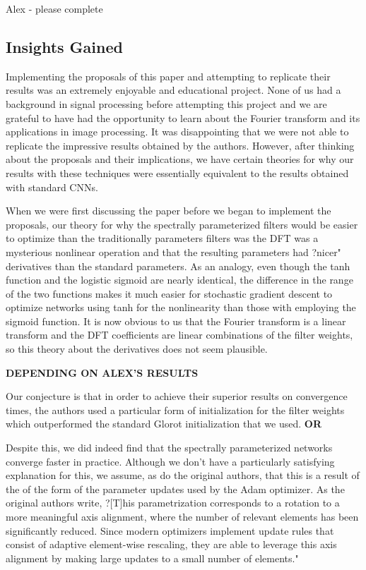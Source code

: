 \documentclass[10pt,journal,compsoc]{IEEEtran}
\begin{document}
Alex - please complete



\subsection{Insights Gained}

Implementing the proposals of this paper and attempting to replicate their results was an extremely enjoyable and educational project. None of us had a background in signal processing before attempting this project and we are grateful to have had the opportunity to learn about the Fourier transform and its applications in image processing. It was disappointing that we were not able to replicate the impressive results obtained by the authors. However, after thinking about the proposals and their implications, we have certain theories for why our results with these techniques were essentially equivalent to the results obtained with standard CNNs. 

When we were first discussing the paper before we began to implement the proposals, our theory for why the spectrally parameterized filters would be easier to optimize than the traditionally parameters filters was the DFT was a mysterious nonlinear operation and that the resulting parameters had ?nicer" derivatives than the standard parameters. As an analogy, even though the tanh function and the logistic sigmoid are nearly identical, the difference in the range of the two functions makes it much easier for stochastic gradient descent to optimize networks using tanh for the nonlinearity than those with employing the sigmoid function. It is now obvious to us that the Fourier transform is a linear transform and the DFT coefficients are linear combinations of the filter weights, so this theory about the derivatives does not seem plausible. 

\textbf{DEPENDING ON ALEX'S RESULTS}

Our conjecture is that in order to achieve their superior results on convergence times, the authors used a particular form of initialization for the filter weights which outperformed the standard Glorot initialization that we used. 
\textbf{OR}

Despite this, we did indeed find that the spectrally parameterized networks converge faster in practice. Although we don't have a particularly satisfying explanation for this, we assume, as do the original authors, that this is a result of the of the form of the parameter updates used by the Adam optimizer. As the original authors write, ?[T]his parametrization corresponds to a rotation to a more meaningful axis alignment, where the number of relevant elements has been significantly reduced. Since modern optimizers implement update rules that consist of adaptive element-wise rescaling, they are able to leverage this axis alignment by making large updates to a small number of elements."
\end{document}
